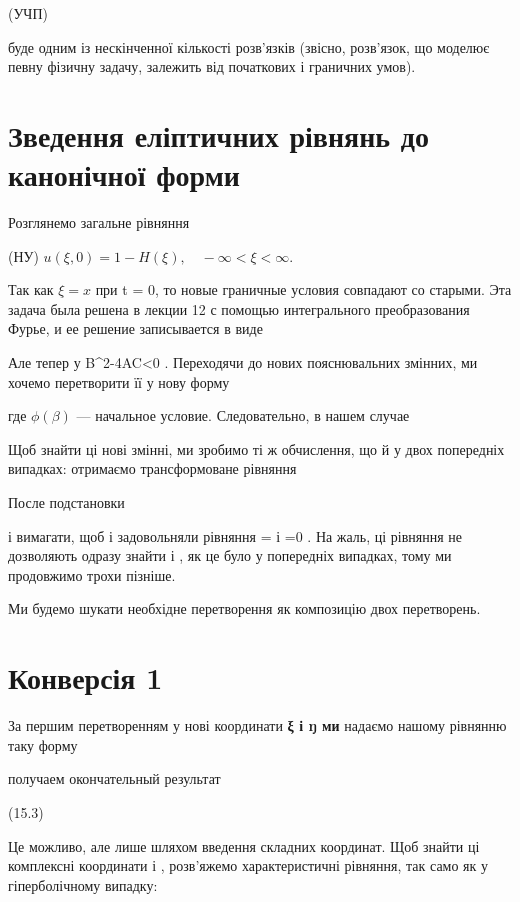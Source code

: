 \documentclass[
  ukrainian,
]{article}
\begin{document}
(УЧП)

буде одним із нескінченної кількості розв'язків (звісно, розв'язок, що
моделює певну фізичну задачу, залежить від початкових і граничних умов).

\section{Зведення еліптичних рівнянь до канонічної
форми}\label{ux437ux432ux435ux434ux435ux43dux43dux44f-ux435ux43bux456ux43fux442ux438ux447ux43dux438ux445-ux440ux456ux432ux43dux44fux43dux44c-ux434ux43e-ux43aux430ux43dux43eux43dux456ux447ux43dux43eux457-ux444ux43eux440ux43cux438}

Розглянемо загальне рівняння

(НУ) \(u(\xi, 0) = 1 - H(\xi), \quad -\infty < \xi < \infty.\)

Так как \(\xi = x\) при t = 0, то новые граничные условия совпадают со
старыми. Эта задача была решена в лекции 12 с помощью интегрального
преобразования Фурье, и ее решение записывается в виде

Але тепер у B\^{}2-4AC\textless0 . Переходячи до нових пояснювальних
змінних, ми хочемо перетворити її у нову форму

где \(\phi(\beta)\) --- начальное условие. Следовательно, в нашем случае

Щоб знайти ці нові змінні, ми зробимо ті ж обчислення, що й у двох
попередніх випадках: отримаємо трансформоване рівняння

После подстановки

і вимагати, щоб \xi і \eta задовольняли рівняння
= і =0 . На жаль, ці рівняння не
дозволяють одразу знайти \xi і \eta , як це було у попередніх випадках,
тому ми продовжимо трохи пізніше.

Ми будемо шукати необхідне перетворення як композицію двох перетворень.

\section{Конверсія
1}\label{ux43aux43eux43dux432ux435ux440ux441ux456ux44f-1}

За першим перетворенням у нові координати \textbf{ξ і ŋ ми} надаємо
нашому рівнянню таку форму

получаем окончательный результат

(15.3)

Це можливо, але лише шляхом введення складних координат. Щоб знайти ці
комплексні координати \xi і \eta , розв'яжемо характеристичні рівняння,
так само як у гіперболічному випадку:
\end{document}
